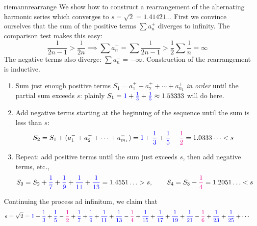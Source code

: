 \begin{example}{}{riemannrearrange}
	We show how to construct a rearrangement of the alternating harmonic series which converges to $s=\sqrt 2=1.41421\ldots$\smallbreak
	First we convince ourselves that the sum of the positive terms $\sum a_n^+$ diverges to infinity. The comparison test makes this easy:
	\[
		\frac 1{2n-1}>\frac 1{2n}\implies \sum a_n^+=\sum \frac 1{2n-1}>\frac 12\sum \frac 1n=\infty
	\]
	The negative terms also diverge: $\sum a_n^-=-\infty$. Construction of the rearrangement is inductive.
	\begin{enumerate}
	  \item Sum just enough positive terms $S_1 =a_1^++a_2^++\cdots+a_{n_1}^+$ \emph{in order} until the partial sum exceeds $s$: plainly $S_1 =\textcolor{blue}{1}+\textcolor{blue}{\frac 13}+\textcolor{blue}{\frac 15} \approx 1.53333$ will do here.
		\item Add negative terms starting at the beginning of the sequence until the sum is less than $s$:
		\[
			S_2=S_1+(a_1^-+a_2^-+\cdots+a_{m_1}^-)
			=\textcolor{blue}{1}+\textcolor{blue}{\frac 13}+\textcolor{blue}{\frac 15} -\textcolor{magenta}{\frac 12} = 1.0333\cdots<s
		\]
		\item Repeat: add positive terms until the sum just exceeds $s$, then add negative terms, etc.,
		\begin{gather*}
			S_3=S_2 +\textcolor{blue}{\frac 17} +\textcolor{blue}{\frac 19} 
			+\textcolor{blue}{\frac 1{11}} +\textcolor{blue}{\frac 1{13}} 
			=1.4551\ldots>s,\qquad 
			S_4=S_3 -\textcolor{magenta}{\frac 14} =1.2051\ldots<s
		\end{gather*}
	\end{enumerate}
	Continuing the process ad infinitum, we claim that	
	\[
		s =\sqrt 2=
		\textcolor{blue}{1} +\textcolor{blue}{\frac 13}
		+\textcolor{blue}{\frac 15} -\textcolor{magenta}{\frac 12} 
		+\textcolor{blue}{\frac 17} +\textcolor{blue}{\frac 19} 
		+\textcolor{blue}{\frac 1{11}} +\textcolor{blue}{\frac 1{13}} 
		-\textcolor{magenta}{\frac 14} +\textcolor{blue}{\frac 1{15}}
		+\textcolor{blue}{\frac 1{17}} +\textcolor{blue}{\frac 1{19}}
		+\textcolor{blue}{\frac 1{21}} -\textcolor{magenta}{\frac 16}
		+\textcolor{blue}{\frac 1{23}} +\textcolor{blue}{\frac 1{25}}
		+\cdots 
	\]

\end{example}
